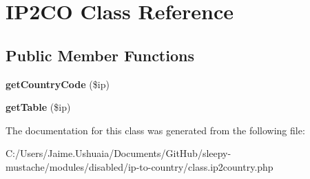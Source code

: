 \hypertarget{class_i_p2_c_o}{\section{I\-P2\-C\-O Class Reference}
\label{class_i_p2_c_o}
}
\subsection*{Public Member Functions}
\begin{DoxyCompactItemize}
\item 
\hypertarget{class_i_p2_c_o_a0aef1ce60812280445e63410f68f00a0}{{\bfseries get\-Country\-Code} (\$ip)}\label{class_i_p2_c_o_a0aef1ce60812280445e63410f68f00a0}

\item 
\hypertarget{class_i_p2_c_o_a827810b3e6446a9dd09e79a0d03f040d}{{\bfseries get\-Table} (\$ip)}\label{class_i_p2_c_o_a827810b3e6446a9dd09e79a0d03f040d}

\end{DoxyCompactItemize}


The documentation for this class was generated from the following file\-:\begin{DoxyCompactItemize}
\item 
C\-:/\-Users/\-Jaime.\-Ushuaia/\-Documents/\-Git\-Hub/sleepy-\/mustache/modules/disabled/ip-\/to-\/country/class.\-ip2country.\-php\end{DoxyCompactItemize}
